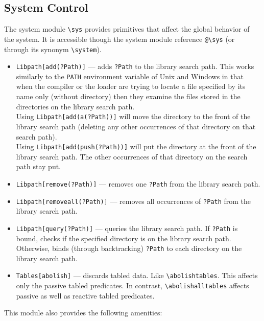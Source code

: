 \documentclass[11pt]{article}
\newcommand{\bs}{\textbackslash}
\begin{document}
\subsection{System Control}\label{sec-flora-syscontrol}

The system module {\tt \bs{}sys} provides primitives that affect the global
behavior of the system. It is accessible though the system module reference
{\tt @\bs{}sys} (or through its synonym {\tt \bs{}system}). 
\begin{itemize}
  \item  {\tt Libpath[add(?Path)]} --- adds {\tt ?Path} to the library
    search path. This works similarly to the {\tt PATH} environment
    variable of Unix and Windows
    in that when the compiler or the loader are trying to locate a
    file specified by its name only (without directory) then they
    examine the files stored in the directories on the library search path.
    \\
    Using \texttt{Libpath[add(a(?Path))]}  will move the directory to the
    front of the library search path (deleting any other occurrences of that
    directory on that search path).\\
    Using \texttt{Libpath[add(push(?Path))]}  will put the directory at the
    front of the library search path. The other occurrences of that
    directory on the search path stay put.
  \item {\tt Libpath[remove(?Path)]} --- removes one {\tt ?Path} from the
    library search path.
  \item {\tt Libpath[removeall(?Path)]} --- removes all occurrences of
    {\tt ?Path} from the library search path.
  \item {\tt Libpath[query(?Path)]} --- queries the library search path. If
    {\tt ?Path} is bound, checks if the specified directory is on the
    library search path. Otherwise, binds (through backtracking) {\tt ?Path}
    to each directory on the library search path.
\index{\bs{}abolishtables}
\index{\bs{}abolishalltables}
\item {\tt Tables[abolish]} --- discards tabled data.  Like
  \texttt{\bs{}abolishtables}.  This affects only the passive tabled
  predicates.  In contrast, \texttt{\bs{}abolishalltables} affects passive
  as well as reactive tabled predicates.
\end{itemize}
This module also provides the following amenities:
\end{document}
